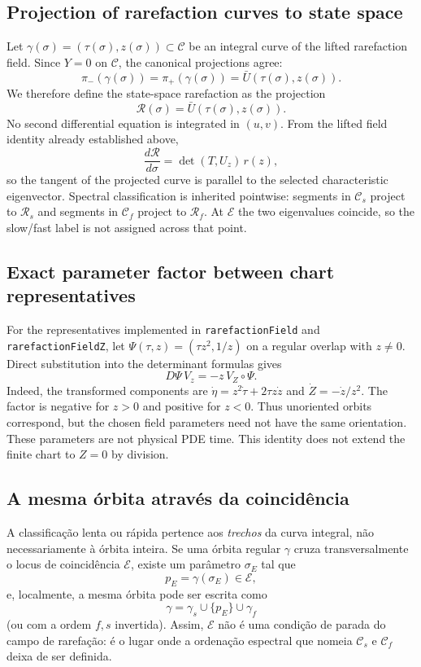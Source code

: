 \subsection{Projection of rarefaction curves to state space}

Let $\gamma(\sigma)=(\tau(\sigma),z(\sigma))\subset\mathcal C$ be an
integral curve of the lifted rarefaction field.  Since $Y=0$ on
$\mathcal C$, the canonical projections agree:
\[
 \pi_-(\gamma(\sigma))=\pi_+(\gamma(\sigma))
 =\bar U(\tau(\sigma),z(\sigma)).
\]
We therefore define the state-space rarefaction as the projection
\[
\boxed{\mathcal R(\sigma)=\bar U(\tau(\sigma),z(\sigma)).}
\]
No second differential equation is integrated in $(u,v)$.  From the lifted
field identity already established above,
\[
 \frac{d\mathcal R}{d\sigma}
 =\det(T,U_z)\,r(z),
\]
so the tangent of the projected curve is parallel to the selected
characteristic eigenvector.  Spectral classification is inherited pointwise:
segments in $\mathcal C_s$ project to $\mathcal R_s$ and segments in
$\mathcal C_f$ project to $\mathcal R_f$.  At $\mathcal E$ the two
eigenvalues coincide, so the slow/fast label is not assigned across that
point.

\subsection{Exact parameter factor between chart representatives}

For the representatives implemented in \texttt{rarefactionField} and
\texttt{rarefactionFieldZ}, let $\Psi(\tau,z)=(\tau z^2,1/z)$ on a regular
overlap with $z\ne0$. Direct substitution into the determinant formulas gives
\[
 D\Psi\,V_z=-z\,V_Z\circ\Psi.
\]
Indeed, the transformed components are
$\dot\eta=z^2\dot\tau+2\tau z\dot z$ and
$\dot Z=-\dot z/z^2$. The factor is negative for $z>0$ and positive for
$z<0$. Thus unoriented orbits correspond, but the chosen field parameters need
not have the same orientation. These parameters are not physical PDE time.
This identity does not extend the finite chart to $Z=0$ by division.

\subsection{A mesma órbita através da coincidência}

A classificação lenta ou rápida pertence aos \emph{trechos} da curva integral,
não necessariamente à órbita inteira.  Se uma órbita regular $\gamma$ cruza
transversalmente o locus de coincidência $\mathcal E$, existe um parâmetro
$\sigma_E$ tal que
\[
 p_E=\gamma(\sigma_E)\in\mathcal E,
\]
e, localmente, a mesma órbita pode ser escrita como
\[
\boxed{
\gamma=\gamma_s\cup\{p_E\}\cup\gamma_f
}
\]
(ou com a ordem $f,s$ invertida).  Assim, $\mathcal E$ não é uma condição de
parada do campo de rarefação: é o lugar onde a ordenação espectral que nomeia
$\mathcal C_s$ e $\mathcal C_f$ deixa de ser definida.


